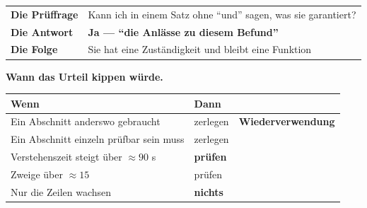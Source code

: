 \begin{merksatz}
\begin{center}
\renewcommand{\arraystretch}{1.5}
\begin{tabular}{@{}P{2.6cm}P{6.2cm}@{}}
\toprule
\textbf{Die Prüffrage} & Kann ich in einem Satz ohne \enquote{und} sagen, was sie garantiert?\\
\textbf{Die Antwort} & \textbf{Ja --- \enquote{die Anlässe zu diesem Befund}}\\
\textbf{Die Folge} & Sie hat eine Zuständigkeit und bleibt eine Funktion\\
\bottomrule
\end{tabular}
\end{center}

\begin{center}
\begin{minipage}{0.88\textwidth}
\end{minipage}
\end{center}

\textbf{Wann das Urteil kippen würde.}

\begin{center}
\renewcommand{\arraystretch}{1.45}
\begin{tabular}{@{}P{3.4cm}P{2.0cm}P{2.4cm}@{}}
\toprule
\textbf{Wenn} & \textbf{Dann} & \\
\midrule
Ein Abschnitt anderswo gebraucht & \textcolor{akzent}{zerlegen} & \textbf{Wieder\-verwendung}\\
Ein Abschnitt einzeln prüfbar sein muss & \textcolor{akzent}{zerlegen} & \\
Verstehenszeit steigt über $\approx90$ s & \textcolor{akzent}{\textbf{prüfen}} & \\
Zweige über $\approx15$ & \textcolor{akzent}{prüfen} & \\
Nur die Zeilen wachsen & \textcolor{gruen}{\textbf{nichts}} & \\
\bottomrule
\end{tabular}
\end{center}

\begin{center}
\end{center}
\end{merksatz}

